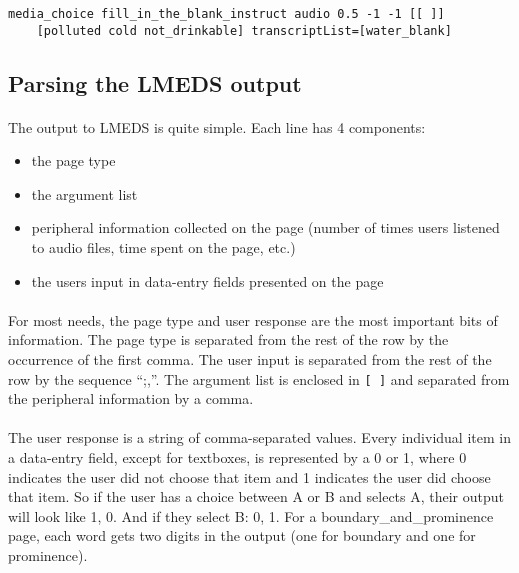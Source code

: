 \begin{lstlisting}
media_choice fill_in_the_blank_instruct audio 0.5 -1 -1 [[ ]]
	[polluted cold not_drinkable] transcriptList=[water_blank]
\end{lstlisting}

\subsection{Parsing the LMEDS output}

\paragraph{}
The output to LMEDS is quite simple.  Each line has 4 components:
\begin{itemize}
\item	the page type
\item	the argument list
\item	peripheral information collected on the page (number of times users listened to audio files, time spent on the page, etc.)
\item	the users input in data-entry fields presented on the page
\end{itemize}

\paragraph{}
For most needs, the page type and user response are the most important bits of information.  The page type is separated from the rest of the row by the occurrence of the first comma.  The user input is separated from the rest of the row by the sequence ``;,''.  The argument list is enclosed in \texttt{[ ]} and separated from the peripheral information by a comma.  

\paragraph{}
The user response is a string of comma-separated values.  Every individual item in a data-entry field, except for textboxes, is represented by a 0 or 1, where 0 indicates the user did not choose that item and 1 indicates the user did choose that item.  So if the user has a choice between A or B and selects A, their output will look like 1, 0.  And if they select B: 0, 1.  For a boundary\_and\_prominence page, each word gets two digits in the output (one for boundary and one for prominence).

